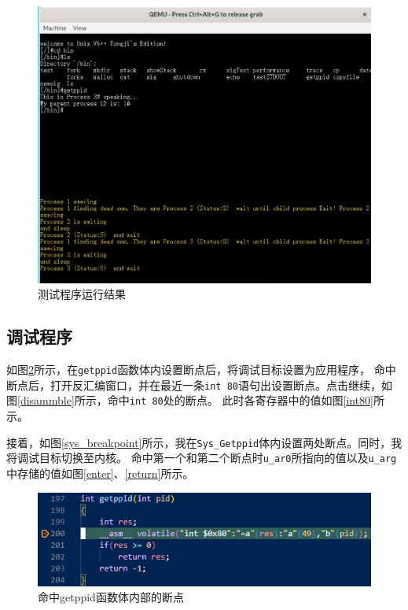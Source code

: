 \begin{figure}[!htbp]
    \centering
    \includegraphics[width=\textwidth]{images/test.png}
    \caption{测试程序运行结果}\label{test}
\end{figure}


\subsection{调试程序}

如图\ref{getppid}所示，在\texttt{getppid}函数体内设置断点后，将调试目标设置为应用程序，
命中断点后，打开反汇编窗口，并在最近一条\texttt{int 80}语句出设置断点。点击继续，如图\ref{disammble}所示，命中\texttt{int 80}处的断点。
此时各寄存器中的值如图\ref{int80}所示。

接着，如图\ref{sys_breakpoint}所示，我在\texttt{Sys\_Getppid}体内设置两处断点。同时，我将调试目标切换至内核。
命中第一个和第二个断点时\texttt{u\_ar0}所指向的值以及\texttt{u\_arg}中存储的值如图\ref{enter}、\ref{return}所示。

\begin{figure}[!htbp]
    \centering
    \includegraphics[scale=1]{images/getppid_breakpoint.png}
    \caption{命中getppid函数体内部的断点}\label{getppid}
\end{figure}

